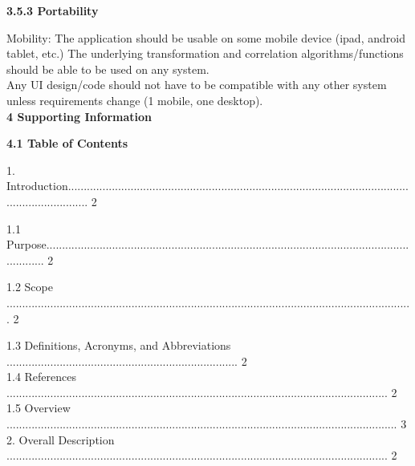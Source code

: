 \documentclass[10pt,draftclsnofoot,onecolumn]{IEEEtran}
\newcommand\tab[1][1cm]{\hspace*{#1}}
\begin{document}
     {\Medium\textbf{3.5.3 Portability}} \\
     \vspace{5mm}

Mobility: The application should be usable on some mobile device (ipad, android tablet, etc.)
The underlying transformation and correlation algorithms/functions should be able to be used on any system.\\
 \vspace{2mm}
Any UI design/code should not have to be compatible with any other system unless requirements change (1 mobile, one desktop).\\
    \vspace{5mm}
 {\Large\textbf{4 Supporting Information}} \\
     \vspace{5mm}

     {\Medium\textbf{4.1 Table of Contents}} \\
          \vspace{5mm}

1. Introduction....................................................................................................................................... 2\\
          \vspace{5mm}

   \tab 1.1 Purpose................................................................................................................................ 2\\
              \vspace{5mm}

   \tab 1.2 Scope .................................................................................................................................. 2\\
                 \vspace{5mm}

   \tab 1.3 Definitions, Acronyms, and Abbreviations .......................................................................... 2\\
                   
                 \vspace{5mm}
     \tab 1.4 References .......................................................................................................................... 2\\
                 \vspace{5mm}
    \tab 1.5 Overview ............................................................................................................................. 3\\
                 \vspace{5mm}
2. Overall Description .......................................................................................................................... 2\\
                 \vspace{5mm}
\end{document}
